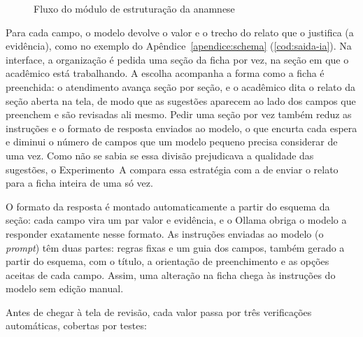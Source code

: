 \begin{figure}[htbp]
	\caption{Fluxo do módulo de estruturação da anamnese}
	\label{fig:fluxo-ia}
	\centering
	\resizebox{\textwidth}{!}{}
\end{figure}

Para cada campo, o modelo devolve o valor e o trecho do relato que o justifica (a evidência), como no exemplo do Apêndice~\ref{apendice:schema} (\autoref{cod:saida-ia}). Na interface, a organização é pedida uma seção da ficha por vez, na seção em que o acadêmico está trabalhando. A escolha acompanha a forma como a ficha é preenchida: o atendimento avança seção por seção, e o acadêmico dita o relato da seção aberta na tela, de modo que as sugestões aparecem ao lado dos campos que preenchem e são revisadas ali mesmo. Pedir uma seção por vez também reduz as instruções e o formato de resposta enviados ao modelo, o que encurta cada espera e diminui o número de campos que um modelo pequeno precisa considerar de uma vez. Como não se sabia se essa divisão prejudicava a qualidade das sugestões, o Experimento~A compara essa estratégia com a de enviar o relato para a ficha inteira de uma só vez.

O formato da resposta é montado automaticamente a partir do esquema da seção: cada campo vira um par valor e evidência, e o Ollama obriga o modelo a responder exatamente nesse formato. As instruções enviadas ao modelo (o \textit{prompt}) têm duas partes: regras fixas e um guia dos campos, também gerado a partir do esquema, com o título, a orientação de preenchimento e as opções aceitas de cada campo. Assim, uma alteração na ficha chega às instruções do modelo sem edição manual.

Antes de chegar à tela de revisão, cada valor passa por três verificações automáticas, cobertas por testes:

